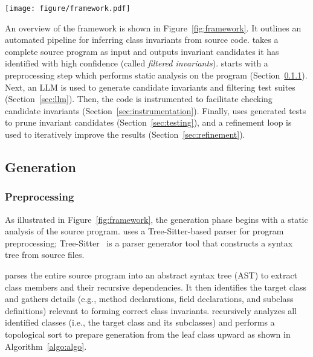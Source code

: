
\begin{figure*}[t]
    \centering
    \texttt{[image: figure/framework.pdf]}  %
    \caption{Overview of \tech.}
    \label{fig:framework}
\end{figure*}


An overview of the \tech framework is shown in Figure~\ref{fig:framework}. It outlines an automated pipeline for inferring class invariants from source code. 
\tech takes a complete source program as input and outputs invariant candidates it has identified with high confidence (called \textit{filtered invariants}).
\tech starts with a preprocessing step which performs static analysis on the program (Section~\ref{sec:preprocess}).  Next, an LLM is used to generate candidate invariants and filtering test suites (Section~\ref{sec:llm}).  Then, the code is instrumented to facilitate checking candidate invariants (Section~\ref{sec:instrumentation}).  
Finally, \tech uses generated tests to prune invariant candidates (Section~\ref{sec:testing}), and a refinement loop is used to iteratively improve the results (Section~\ref{sec:refinement}). 



\subsection{Generation}
\label{subsec:generation}


\subsubsection{Preprocessing}
\label{sec:preprocess}

As illustrated in Figure~\ref{fig:framework}, the generation phase begins with a static analysis of the source program. \tech uses a Tree-Sitter-based parser for program preprocessing; Tree-Sitter~\cite{treesitter} is a parser generator tool that constructs a syntax tree from source files.

\tech parses the entire source program into an abstract syntax tree (AST) to extract class members and their recursive dependencies. It then identifies the target class and gathers details (e.g., method declarations, field declarations, and subclass definitions) relevant to forming correct class invariants. \tech recursively analyzes all identified classes (i.e., the target class and its subclasses) and performs a topological sort to prepare generation from the leaf class upward as shown in Algorithm~\ref{algo:algo}.


